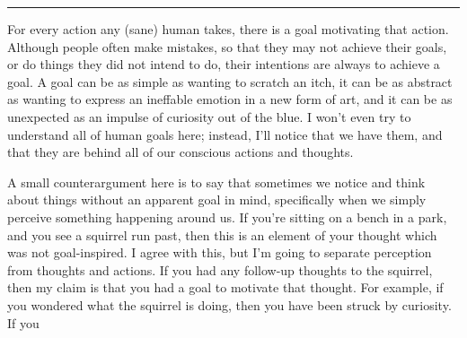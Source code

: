 \documentclass[11pt, oneside]{article}   	%
\newcommand\hr{\bigskip\hrule\bigskip}
\begin{document}
\hr

For every action any (sane) human takes, there is a goal motivating that action.
Although people often make mistakes, so that they may not achieve their goals,
or do things they did not intend to do, their intentions are always to achieve a
goal. A goal can be as simple as wanting to scratch an itch, it can be as
abstract as wanting to express an ineffable emotion in a new form of art, and it
can be as unexpected as an impulse of curiosity out of the blue. I won't even
try to understand all of human goals here; instead, I'll notice that we have
them, and that they are behind all of our conscious actions and thoughts.

A small counterargument here is to say that sometimes we notice and think about
things without an apparent goal in mind, specifically when we simply perceive
something happening around us. If you're sitting on a bench in a park, and you
see a squirrel run past, then this is an element of your thought which was not
goal-inspired. I agree with this, but I'm going to separate perception from
thoughts and actions. If you had any follow-up thoughts to the squirrel, then my
claim is that you had a goal to motivate that thought. For example, if you
wondered what the squirrel is doing, then you have been struck by curiosity. If
you 





%

\end{document}
